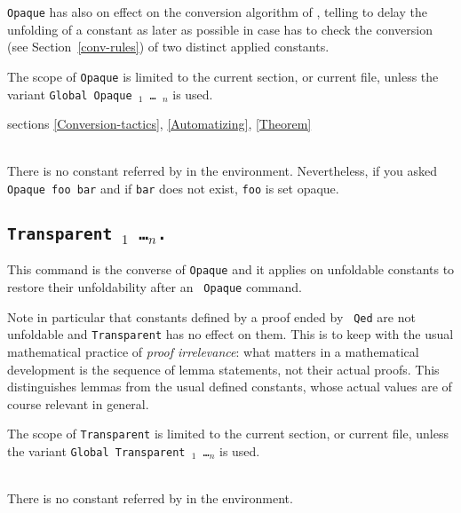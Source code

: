 {\tt Opaque} has also on effect on the conversion algorithm of {\Coq},
telling to delay the unfolding of a constant as later as possible in
case {\Coq} has to check the conversion (see Section~\ref{conv-rules})
of two distinct applied constants.

The scope of {\tt Opaque} is limited to the current section, or
current file, unless the variant {\tt Global Opaque \qualid$_1$ \dots
\qualid$_n$} is used.

\SeeAlso sections \ref{Conversion-tactics}, \ref{Automatizing},
\ref{Theorem}

\begin{ErrMsgs}
\item {}\\
    There is no constant referred by {\qualid} in the environment.
    Nevertheless, if you asked \texttt{Opaque foo bar}
    and if \texttt{bar} does not exist, \texttt{foo} is set opaque.
\end{ErrMsgs}

\subsection[\tt Transparent \qualid$_1$ \dots \qualid$_n$.]{\tt Transparent \qualid$_1$ \dots \qualid$_n$.\label{Transparent}}
This command is the converse of {\tt Opaque} and it applies on
unfoldable constants to restore their unfoldability after an {\tt
Opaque} command.

Note in particular that constants defined by a proof ended by {\tt
Qed} are not unfoldable and {\tt Transparent} has no effect on
them. This is to keep with the usual mathematical practice of {\em
proof irrelevance}: what matters in a mathematical development is the
sequence of lemma statements, not their actual proofs. This
distinguishes lemmas from the usual defined constants, whose actual
values are of course relevant in general.

The scope of {\tt Transparent} is limited to the current section, or
current file, unless the variant {\tt Global Transparent \qualid$_1$
\dots \qualid$_n$} is used.

\begin{ErrMsgs}
\item {}\\
    There is no constant referred by {\qualid} in the environment.
\end{ErrMsgs}

